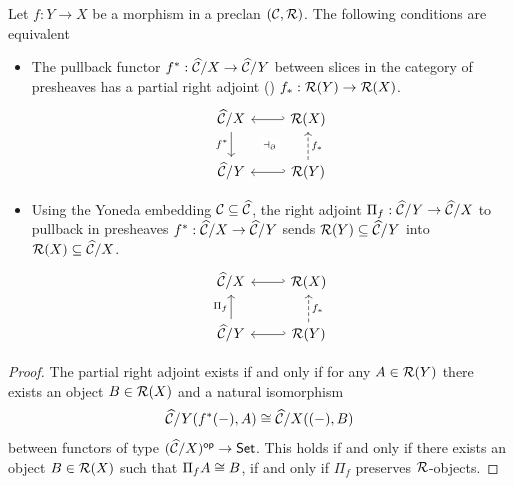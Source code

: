 \begin{proposition} \label{prop:pra-defs}
  Let $f : Y \to X$ be a morphism in a preclan $(\mathcal{C},\mathcal{R})$.
  The following conditions are equivalent
  \begin{itemize}
  \item
    The pullback functor
    $f^* : \widehat{\mathcal{C}} / X \to \widehat{\mathcal{C}} / Y$ between slices in the category of presheaves
    has a partial right adjoint ()
    $f_* : \mathcal{R}(Y) \to \mathcal{R}(X)$.
    \[\begin{tikzcd}
      \wCC / X & {\RR(X)} \\
      \wCC / Y & {\RR(Y)}
      \arrow[""{name=0, anchor=center, inner sep=0}, "f^*"', from=1-1, to=2-1]
      \arrow[hook', from=1-2, to=1-1]
      \arrow[""{name=1, anchor=center, inner sep=0}, "{f_*}"', dashed, from=2-2, to=1-2]
      \arrow[hook', from=2-2, to=2-1]
      \arrow["{\dashv_\partial}"{description}, draw=none, from=0, to=1]
    \end{tikzcd}\]
    
  \item
    Using the Yoneda embedding $\mathcal{C} \subseteq \widehat{\mathcal{C}}$,
    the right adjoint $\Pi_f : \widehat{\mathcal{C}}/Y \to \widehat{\mathcal{C}}/X$
    to pullback in presheaves $f^* : \widehat{\mathcal{C}}/X \to \widehat{\mathcal{C}}/Y$
    sends $\mathcal{R}(Y) \subseteq \widehat{\mathcal{C}}/Y$
    into $\mathcal{R}(X) \subseteq \widehat{\mathcal{C}}/X$.
    \[\begin{tikzcd}
      {\wCC / X} & {\RR(X)} \\
      {\wCC / Y} & {\RR(Y)}
      \arrow[hook', from=1-2, to=1-1]
      \arrow["{\Pi_f}", from=2-1, to=1-1]
      \arrow["{f_*}"', dashed, from=2-2, to=1-2]
      \arrow[hook', from=2-2, to=2-1]
    \end{tikzcd}\]
  \end{itemize}
\end{proposition}
\begin{proof}
  The partial right adjoint exists if and only if
  for any $A \in \mathcal{R}(Y)$ there exists an object $B \in \mathcal{R}(X)$
  and a natural isomorphism
  \[ \widehat{\mathcal{C}}/Y (f^*(-),A) \cong \widehat{\mathcal{C}}/X((-),B)\]
  between functors of type $(\widehat{\mathcal{C}} / X)^{\mathsf{op}} \to \mathsf{Set}$.  
  This holds if and only if
  there exists an object $B \in \mathcal{R}(X)$ such that $\Pi_f A \cong B$,
  if and only if $\Pi_f$ preserves $\mathcal{R}$-objects.
\end{proof}


